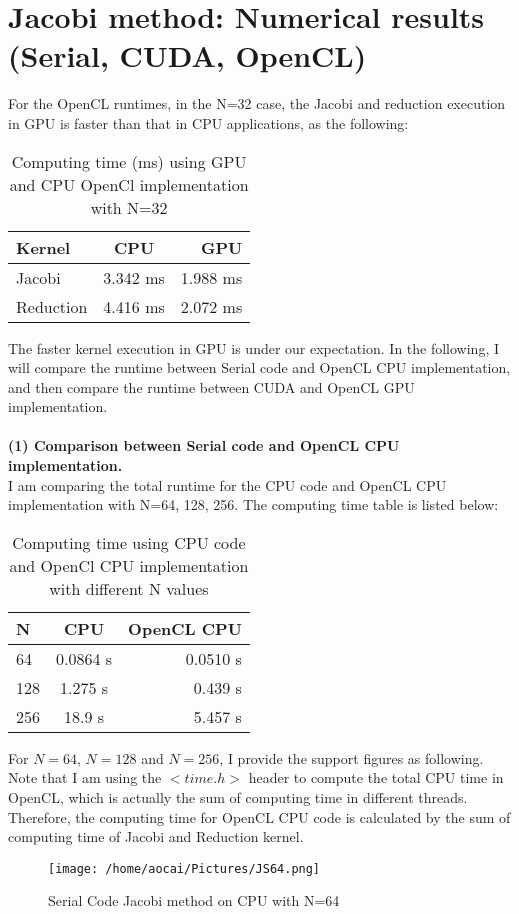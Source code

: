 \documentclass[12pt]{article}
\begin{document}
\section{Jacobi method: Numerical results (Serial, CUDA, OpenCL)}
For the OpenCL runtimes, in the N=32 case, the Jacobi and reduction execution in GPU is faster than that in CPU applications, as the following:
\begin{table}[H]
	\centering
	\label{tab:N32}
	\begin{tabular}{lcr}
	\bfseries Kernel & CPU & GPU\\ \hline
	Jacobi & 3.342 ms & 1.988 ms\\
	Reduction & 4.416 ms & 2.072 ms\\
	\end{tabular}
	\caption[This is optional caption, without reference]{Computing time (ms) using GPU and CPU OpenCl implementation with N=32}
\end{table}
The faster kernel execution in GPU is under our expectation. In the following, I will compare the runtime between Serial code and OpenCL CPU implementation, and then compare the runtime between CUDA and OpenCL GPU implementation.\\\\
{\bfseries(1) Comparison between Serial code and OpenCL CPU implementation.}\\
I am comparing the total runtime for the CPU code and OpenCL CPU implementation with N=64, 128, 256. The computing time table is listed below:
\begin{table}[H]
	\centering
	\label{tab:oclcpu}
	\begin{tabular}{lcr}
	\bfseries N & CPU & OpenCL CPU\\ \hline
	64 & 0.0864 s & 0.0510 s\\
	128 & 1.275 s & 0.439 s\\
	256 & 18.9 s & 5.457 s\\
	\end{tabular}
	\caption[This is optional caption, without reference]{Computing time using CPU code and OpenCl CPU implementation with different N values}
\end{table}
For $N=64$, $N = 128$ and $N = 256$, I provide the support figures as following. Note that I am using the $<time.h>$ header to compute the total CPU time in OpenCL, which is actually the sum of computing time in different threads. Therefore, the computing time for OpenCL CPU code is calculated by the sum of computing time of Jacobi and Reduction kernel.
\begin{figure}[H]
	\centering
	\texttt{[image: /home/aocai/Pictures/JS64.png]}
	\caption[Optional caption]{Serial Code Jacobi method on CPU with N=64}
	\label{fig:JS64}
\end{figure}
\end{document}
